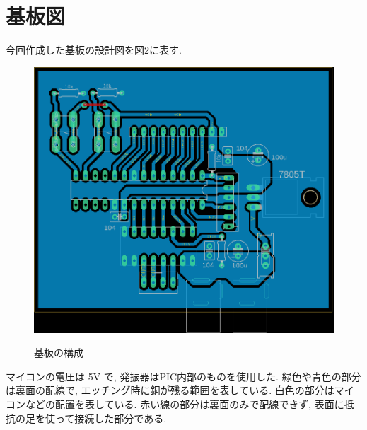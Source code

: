 \documentclass[
]{ltjarticle}
\begin{document}
\section{基板図}
今回作成した基板の設計図を図2に表す. 
\begin{figure}[H]
\centering
\includegraphics[width=\linewidth]{report/fig2.png}
\label{fig:fig2}
\caption{基板の構成}
\end{figure}
マイコンの電圧は 5V で, 発振器はPIC内部のものを使用した. 緑色や青色の部分は裏面の配線で, エッチング時に銅が残る範囲を表している. 白色の部分はマイコンなどの配置を表している. 赤い線の部分は裏面のみで配線できず, 表面に抵抗の足を使って接続した部分である. 
\end{document}

